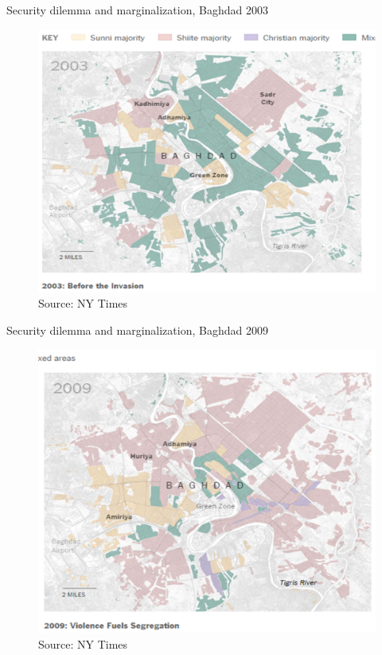\documentclass[xcolor=table]{beamer}
\begin{document}
\begin{frame}{Security dilemma and marginalization, Baghdad 2003}
\begin{figure}
\centering
\includegraphics[scale=.45]{pictures/week23_baghdad1.png}
\caption{Source: NY Times}
\end{figure}
\end{frame}

\begin{frame}{Security dilemma and marginalization, Baghdad 2009}
\begin{figure}
\centering
\includegraphics[scale=.45]{pictures/week23_baghdad2.png}
\caption{Source: NY Times}
\end{figure}
\end{frame}
\end{document}
